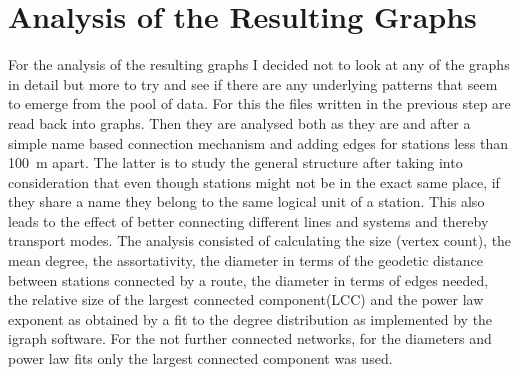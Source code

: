 \section{Analysis of the Resulting Graphs}
For the analysis of the resulting graphs I decided not to look at any of the graphs in detail but more to try and see if there are any underlying patterns that seem to emerge from the pool of data.
For this the files written in the previous step are read back into graphs.
Then they are analysed both as they are and after a simple name based connection mechanism and adding edges for stations less than \SI{100}{\meter} apart.
The latter is to study the general structure after taking into consideration that even though stations might not be in the exact same place, if they share a name they belong to the same logical unit of a station.
This also leads to the effect of better connecting different lines and systems and thereby transport modes.
The analysis consisted of calculating the size (vertex count), the mean degree, the assortativity, the diameter in terms of the geodetic distance between stations connected by a route, the diameter in terms of edges needed, the relative size of the largest connected component(LCC) and the power law exponent as obtained by a fit to the degree distribution as implemented by the igraph software\cite{igraph}.
For the not further connected networks, for the diameters and power law fits only the largest connected component was used.\label{sec:analysis-41}

